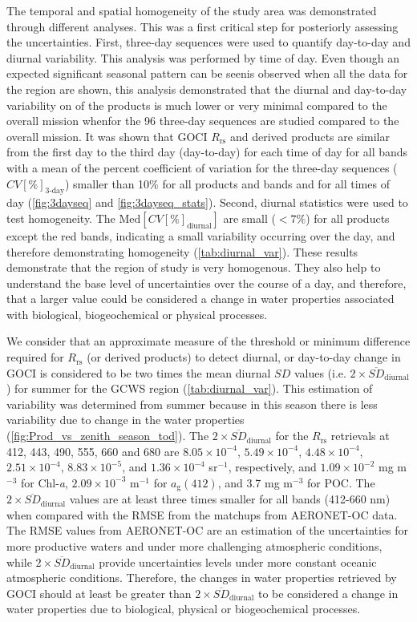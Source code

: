 \documentclass[remotesensing,article,submit,moreauthors,pdftex,10pt,a4paper]{Definitions/mdpi}
\begin{document}
The temporal and spatial homogeneity of the study area was demonstrated through different analyses. This was a first critical step for posteriorly assessing the uncertainties. First, three-day sequences were used to quantify day-to-day and diurnal variability. This analysis was performed by time of day. Even though an expected significant seasonal pattern can be seenis observed when all the data for the region are shown, this analysis demonstrated that the diurnal and day-to-day variability on of the products is much lower or very minimal compared to the overall mission whenfor the 96 three-day sequences are studied compared to the overall mission. It was shown that GOCI $R_\text{rs}$ and derived products are similar from the first day to the third day (day-to-day) for each time of day for all bands with a mean of the percent coefficient of variation for the three-day sequences ($CV[\%]_\text{3-day}$) smaller than 10\% for all products and bands and for all times of day (\autoref{fig:3dayseq} and \autoref{fig:3dayseq_stats}). Second, diurnal statistics were used to test homogeneity. The $\text{Med}[CV[\%]_\text{diurnal}]$ are small ($<7\%$) for all products except the red bands, indicating a small variability occurring over the day, and therefore demonstrating homogeneity (\autoref{tab:diurnal_var}). These results demonstrate that the region of study is very homogenous. They also help to understand the base level of uncertainties over the course of a day, and therefore, that a larger value could be considered a change in water properties associated with biological, biogeochemical or physical processes.

We consider that an approximate measure of the threshold or minimum difference required for $R_\text{rs}$ (or derived products) to detect diurnal, or day-to-day change in GOCI is considered to be two times the mean diurnal $SD$ values (i.e. $2\times \overline{SD}_\text{diurnal}$) for summer for the GCWS region (\autoref{tab:diurnal_var}). This estimation of variability was determined from summer because in this season there is less variability due to change in the water properties (\autoref{fig:Prod_vs_zenith_season_tod}). The $2\times \overline{SD}_\text{diurnal}$ for the $R_\text{rs}$ retrievals at 412, 443, 490, 555, 660 and 680 are $8.05\times10^{-4}$, $5.49\times10^{-4}$, $4.48\times10^{-4}$, $2.51\times10^{-4}$, $8.83\times10^{-5}$, and $1.36\times10^{-4}$ sr$^{-1}$, respectively, and $1.09\times10^{-2}$  mg m$^{-3}$ for Chl-{\it a},  $2.09\times10^{-3}$ m$^{-1}$ for $a_\text{g}(412)$, and 3.7 mg m$^{-3}$ for POC. The $2\times \overline{SD}_\text{diurnal}$ values are at least three times smaller for all bands (412-660 nm) when compared with the RMSE from the matchups from AERONET-OC data. The RMSE values from AERONET-OC are an estimation of the uncertainties for more productive waters and under more challenging atmospheric conditions, while $2\times \overline{SD}_\text{diurnal}$ provide uncertainties levels under more constant oceanic atmospheric conditions.  Therefore, the changes in water properties retrieved by GOCI should at least be greater than $2\times \overline{SD}_\text{diurnal}$ to be considered a change in water properties due to biological, physical or biogeochemical processes.
\end{document}
